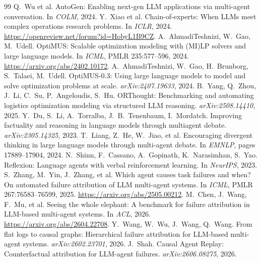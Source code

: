 \documentclass[a4paper,fleqn]{cas-sc}
\begin{document}
\begin{thebibliography}{99}
 Q.~Wu et al. AutoGen: Enabling next-gen LLM applications via multi-agent conversation. In \emph{COLM}, 2024.
 Y.~Xiao et al. Chain-of-experts: When LLMs meet complex operations research problems. In \emph{ICLR}, 2024. \url{https://openreview.net/forum?id=HobyL1B9CZ}.
 A.~AhmadiTeshnizi, W.~Gao, M.~Udell. OptiMUS: Scalable optimization modeling with (MI)LP solvers and large language models. In \emph{ICML}, PMLR 235:577--596, 2024. \url{https://arxiv.org/abs/2402.10172}.
 A.~AhmadiTeshnizi, W.~Gao, H.~Brunborg, S.~Talaei, M.~Udell. OptiMUS-0.3: Using large language models to model and solve optimization problems at scale. \emph{arXiv:2407.19633}, 2024.
 B.~Yang, Q.~Zhou, J.~Li, C.~Su, P.~Angeloudis, S.~Hu. ORThought: Benchmarking and automating logistics optimization modeling via structured LLM reasoning. \emph{arXiv:2508.14410}, 2025.
 Y.~Du, S.~Li, A.~Torralba, J.~B.~Tenenbaum, I.~Mordatch. Improving factuality and reasoning in language models through multiagent debate. \emph{arXiv:2305.14325}, 2023.
 T.~Liang, Z.~He, W.~Jiao, et al. Encouraging divergent thinking in large language models through multi-agent debate. In \emph{EMNLP}, pages 17889--17904, 2024.
 N.~Shinn, F.~Cassano, A.~Gopinath, K.~Narasimhan, S.~Yao. Reflexion: Language agents with verbal reinforcement learning. In \emph{NeurIPS}, 2023.
 S.~Zhang, M.~Yin, J.~Zhang, et al. Which agent causes task failures and when? On automated failure attribution of LLM multi-agent systems. In \emph{ICML}, PMLR 267:76583--76599, 2025. \url{https://arxiv.org/abs/2505.00212}.
 M.~Chen, J.~Wang, F.~Mu, et al. Seeing the whole elephant: A benchmark for failure attribution in LLM-based multi-agent systems. In \emph{ACL}, 2026. \url{https://arxiv.org/abs/2604.22708}.
 Y.~Wang, W.~Wu, J.~Wang, Q.~Wang. From flat logs to causal graphs: Hierarchical failure attribution for LLM-based multi-agent systems. \emph{arXiv:2602.23701}, 2026.
 J.~Shah. Causal Agent Replay: Counterfactual attribution for LLM-agent failures. \emph{arXiv:2606.08275}, 2026.

\end{thebibliography}
\end{document}
